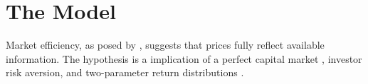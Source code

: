 \documentclass[a4paper]{article}
\begin{document}
\begin{comment}
An implication of the impact of news on security prices comes from the latter's effects on monetary policy. \citet{jovanoviczimmermann2010} shows that stock market uncertainty affects monetary policy in the USA, while \citet{naraidooraputsoane2015} shows this relationship in South Africa.

\cite{gabrielribeiro2013} LER METODOLOGIA, ACHO QUE PODE EXPICAR MELHOR A RELACAO ENTRE VOLATILIDADE ANORMAL E INEFICIENCIA
\citet{oprean2012} LER, FALA SOBRE TESTE DE EFICIENCIA
\end{comment}
\begin{comment}
\todo{Buscar outras citações, lembre do Mandelbrot e do Fama 1963 Journal of Busines})
As a consequence, \citet{pearce1987} states If the market is efficient there is no economic profit to be done with publicly available information, and investors should expect normal returns for the risk they bear, independent of the (publicly available) information they have access to.
Recent work on the effect of news on financial prices report a significant impact of those news on commondities and stock (\citet{larsenthorsrud2017} \citet{caporaleetal2015}).
Tests of market efficiency vary depending on the form of efficiency being tested. Tests for the weak form consist in testing if the historical prices follow a random walk (thus if they have a unit root). This is because, if current prices reflect historical prices, then there is no economic profit to be done with historical prices, so the best forecast for the price at the next period is always the current price, what defines the price as a random walk. Tests of weak form market efficiency include \citet{dongetal2013}, \citet{kamal2014}, and \citet{narayanetal2016}, which all reject weak form market efficiency.
\end{comment}


\section{The Model}


Market efficiency, as posed by \citet{fama1970}, suggests that prices fully reflect available information. The hypothesis is a implication of a perfect capital market , investor risk aversion, and two-parameter return distributions \citet{famamcbeth1973}.

\begin{comment}
providing accurate signals for resource allocation. Prices should reflect information as it reflects the forecasts of future prices, which should be revised with the arrival of new information.
\end{comment}
\end{document}
